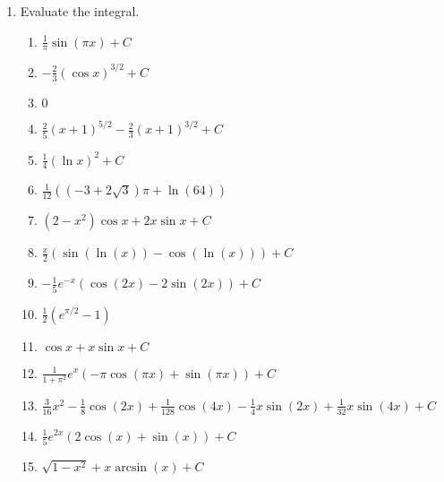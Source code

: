 \documentclass[letterpaper]{article}
\begin{document}
\begin{enumerate}

\item Evaluate the integral.
	\begin{enumerate}

	\item $\frac1\pi \sin(\pi x) +C$

	\item $-\frac23 (\cos x)^{3/2}+C$

	\item $0$

	\item $\frac25 (x+1)^{5/2}-\frac23(x+1)^{3/2} +C$

	\item $\frac14(\ln x)^2+C$

	\item $\frac{1}{12} \left(\left(-3+2 \sqrt{3}\right) \pi +\ln(64)\right)$

	\item $(2-x^2)\cos x + 2x\sin x +C$

	\item $\frac x2 \left(\sin(\ln(x))-\cos(\ln(x))\right)+C$

	\item $-\frac15 e^{-x}(\cos (2x)-2\sin(2x))+C$

	\item $\frac12 (e^{\pi/2}-1)$

	\item $\cos x + x\sin x +C$

	\item $\frac1{1+\pi^2} e^x(-\pi \cos(\pi x)+\sin(\pi x))+C$

	\item $\frac{3}{16}x^2-\frac{1}{8} \cos(2 x)+\frac{1}{128} \cos(4 x)-\frac{1}{4} x \sin(2 x)+\frac{1}{32} x \sin(4 x)+C$

	\item $\frac{1}{5} e^{2 x} (2 \cos(x)+\sin(x))+C$

	\item $\sqrt{1-x^2}+x \arcsin(x)+C$


\end{enumerate}
\end{enumerate}
\end{document}
